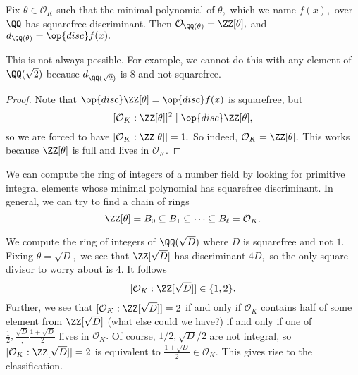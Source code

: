 \documentclass[../notes.tex]{subfiles}
\begin{document}
\begin{cor}
    Fix $\theta\in\mathcal O_K$ such that the minimal polynomial of $\theta,$ which we name $f(x),$ over $\QQ$ has squarefree discriminant. Then $\mathcal O_{\QQ(\theta)}=\ZZ[\theta],$ and $d_{\QQ(\theta)}=\op{disc}f(x).$
\end{cor}
\begin{remark}
    This is not always possible. For example, we cannot do this with any element of $\QQ(\sqrt2)$ because $d_{\QQ(\sqrt2)}$ is $8$ and not squarefree.
\end{remark}
\begin{proof}
    Note that $\op{disc}\ZZ[\theta]=\op{disc}f(x)$ is squarefree, but
    \[[\mathcal O_K:\ZZ[\theta]]^2\mid\op{disc}\ZZ[\theta],\]
    so we are forced to have $[\mathcal O_K:\ZZ[\theta]]=1.$ So indeed, $\mathcal O_K=\ZZ[\theta].$ This works because $\ZZ[\theta]$ is full and lives in $\mathcal O_K.$
\end{proof}
We can compute the ring of integers of a number field by looking for primitive integral elements whose minimal polynomial has squarefree discriminant. In general, we can try to find a chain of rings
\[\ZZ[\theta]=B_0\subseteq B_1\subseteq\cdots\subseteq B_\ell=\mathcal O_K.\]
\begin{ex}
    We compute the ring of integers of $\QQ(\sqrt D)$ where $D$ is squarefree and not $1.$ Fixing $\theta=\sqrt D,$ we see that $\ZZ[\sqrt D]$ has discriminant $4D,$ so the only square divisor to worry about is $4.$ It follows
    \[[\mathcal O_K:\ZZ[\sqrt D]]\in\{1,2\}.\]
    Further, we see that $[\mathcal O_K:\ZZ[\sqrt D]]=2$ if and only if $\mathcal O_K$ contains half of some element from $\ZZ[\sqrt D]$ (what else could we have?) if and only if one of $\frac12,\frac{\sqrt D},\frac{1+\sqrt D}2$ lives in $\mathcal O_K.$ Of course, $1/2,\sqrt D/2$ are not integral, so $[\mathcal O_K:\ZZ[\sqrt D]]=2$ is equivalent to $\frac{1+\sqrt D}2\in\mathcal O_K.$ This gives rise to the classification.
\end{ex}
\end{document}
